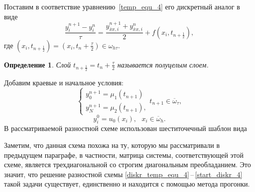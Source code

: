 \documentclass[11pt,a4paper,twoside,listtotoc,bibtotoc]{report}
\numberwithin{equation}{section}
\newtheorem*{definition}{Определение}
\theoremstyle{definition}
\theoremstyle{plain}
\begin{document}
Поставим в соответствие уравнению~\eqref{temp_equ_4} его дискретный аналог
в виде
%
\begin{equation}
%
    \label{diskr_temp_equ_4}
    \frac{y_i^{n+1} - y_i^n}{\tau} = \frac{y_{\overline{x}x, i}^{n+1} +
    y_{\overline{x}x, i}^n}{2} + f(x_i, t_{n+\frac12}),
%
\end{equation}
%
где $(x_i, t_{n+\frac12}) = \left(x_i, t_{n} + \frac{\tau}{2}\right) \in \omega_{h \tau}$.
%
\begin{definition}
%
    Слой $t_{n+\frac12} = t_{n} + \frac{\tau}{2}$ называется полуцелым слоем.
%
\end{definition}
%
%
Добавим краевые и начальное условия:
%
\begin{equation}
%
    \label{bord_diskr_4}
    \begin{cases}
        y_0^{n+1} = \mu_1(t_{n+1}) \\
        y_N^{n+1} = \mu_2(t_{n+1}),
    \end{cases}
    t_{n+1}\in \overline{\omega}_{\tau},
%
\end{equation}
%
%
\begin{equation}
%
    \label{start_diskr_4}
    y_i^0 = u_0(x_i),~~~x_i\in \overline{\omega}_h.
%
\end{equation}
%
В рассматриваемой разностной схеме использован шеститочечный шаблон вида
%
\begin{figure}[H]
\centering
{}
\end{figure}
%

Заметим, что данная схема похожа на ту, которую мы рассматривали
в предыдущем параграфе, в частности, матрица системы,
соответствующей этой схеме, является
трехдиагональной со строгим диагональным преобладанием.
Это значит, что решение разностной схемы
\eqref{diskr_temp_equ_4}\,--\,\eqref{start_diskr_4} такой
задачи существует, единственно и находится с помощью метода прогонки.
\end{document}
